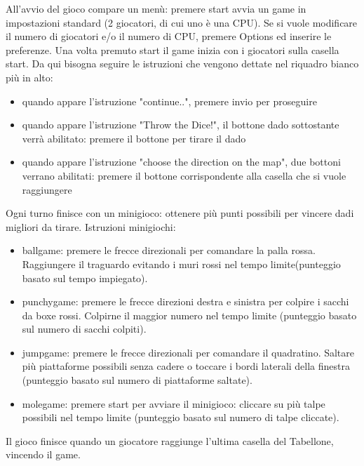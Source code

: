 \documentclass[a4paper,12pt]{report}
\begin{document}
	All'avvio del gioco compare un menù: premere start avvia un game in impostazioni standard (2 giocatori, di cui uno è una CPU).
	Se si vuole modificare il numero di giocatori e/o il numero di CPU, premere Options ed inserire le preferenze.
	Una volta premuto start il game inizia con i giocatori sulla casella start.
	Da qui bisogna seguire le istruzioni che vengono dettate nel riquadro bianco più in alto:
	\begin {itemize}
		\item quando appare l'istruzione "continue..", premere invio per proseguire
		\item quando appare l'istruzione "Throw the Dice!", il bottone dado sottostante verrà abilitato: premere il bottone per tirare il dado
		\item quando appare l'istruzione "choose the direction on the map", due bottoni verrano abilitati: premere il bottone corrispondente alla casella che si vuole raggiungere
	\end {itemize}
	Ogni turno finisce con un minigioco: ottenere più punti possibili per vincere dadi migliori da tirare.
	Istruzioni minigiochi:
	\begin {itemize}
		\item ballgame: premere le frecce direzionali per comandare la palla rossa. Raggiungere il traguardo evitando i muri rossi nel tempo limite(punteggio basato sul tempo impiegato).
		\item punchygame: premere le frecce direzioni destra e sinistra per colpire i sacchi da boxe rossi. Colpirne il maggior numero nel tempo limite (punteggio basato sul numero di sacchi colpiti).
		\item jumpgame: premere le frecce direzionali per comandare il quadratino. Saltare più piattaforme possibili senza cadere o toccare i bordi laterali della finestra (punteggio basato sul numero di piattaforme saltate).
		\item molegame: premere start per avviare il minigioco: cliccare su più talpe possibili nel tempo limite (punteggio basato sul numero di talpe cliccate).
	\end {itemize}
	Il gioco finisce quando un giocatore raggiunge l'ultima casella del Tabellone, vincendo il game.


	
	
\end{document}
